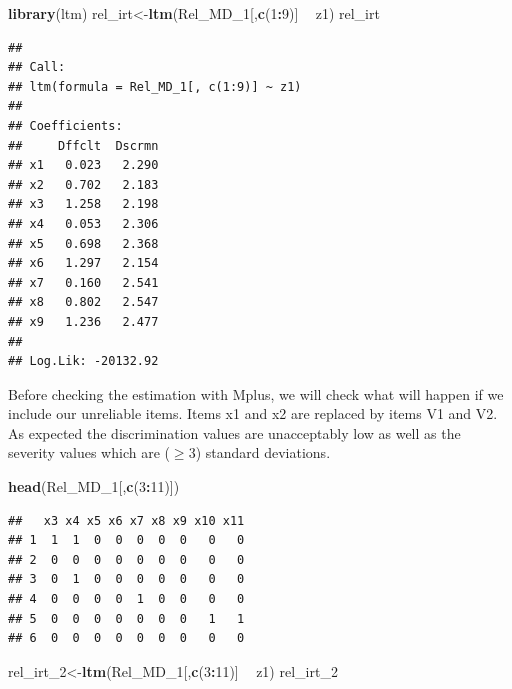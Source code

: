 \documentclass[]{book}
\newenvironment{Shaded}{\begin{snugshade}}{\end{snugshade}}
\newcommand{\DecValTok}[1]{\textcolor[rgb]{0.00,0.00,0.81}{#1}}
\newcommand{\KeywordTok}[1]{\textcolor[rgb]{0.13,0.29,0.53}{\textbf{#1}}}
\newcommand{\NormalTok}[1]{#1}
\newcommand{\OperatorTok}[1]{\textcolor[rgb]{0.81,0.36,0.00}{\textbf{#1}}}
\newcommand{\StringTok}[1]{\textcolor[rgb]{0.31,0.60,0.02}{#1}}
\begin{document}
\begin{Shaded}
\begin{Highlighting}[]
\KeywordTok{library}\NormalTok{(ltm)}
\NormalTok{rel_irt<-}\KeywordTok{ltm}\NormalTok{(Rel_MD_}\DecValTok{1}\NormalTok{[,}\KeywordTok{c}\NormalTok{(}\DecValTok{1}\OperatorTok{:}\DecValTok{9}\NormalTok{)] }\OperatorTok{~}\StringTok{ }\NormalTok{z1)}
\NormalTok{rel_irt}
\end{Highlighting}
\end{Shaded}

\begin{verbatim}
## 
## Call:
## ltm(formula = Rel_MD_1[, c(1:9)] ~ z1)
## 
## Coefficients:
##     Dffclt  Dscrmn
## x1   0.023   2.290
## x2   0.702   2.183
## x3   1.258   2.198
## x4   0.053   2.306
## x5   0.698   2.368
## x6   1.297   2.154
## x7   0.160   2.541
## x8   0.802   2.547
## x9   1.236   2.477
## 
## Log.Lik: -20132.92
\end{verbatim}

Before checking the estimation with Mplus, we will check what will happen if we include our unreliable items. Items x1 and x2 are replaced by items V1 and V2. As expected the discrimination values are unacceptably low as well as the severity values which are (\(\geq3\)) standard deviations.

\begin{Shaded}
\begin{Highlighting}[]
\KeywordTok{head}\NormalTok{(Rel_MD_}\DecValTok{1}\NormalTok{[,}\KeywordTok{c}\NormalTok{(}\DecValTok{3}\OperatorTok{:}\DecValTok{11}\NormalTok{)])}
\end{Highlighting}
\end{Shaded}

\begin{verbatim}
##   x3 x4 x5 x6 x7 x8 x9 x10 x11
## 1  1  1  0  0  0  0  0   0   0
## 2  0  0  0  0  0  0  0   0   0
## 3  0  1  0  0  0  0  0   0   0
## 4  0  0  0  0  1  0  0   0   0
## 5  0  0  0  0  0  0  0   1   1
## 6  0  0  0  0  0  0  0   0   0
\end{verbatim}

\begin{Shaded}
\begin{Highlighting}[]
\NormalTok{rel_irt_}\DecValTok{2}\NormalTok{<-}\KeywordTok{ltm}\NormalTok{(Rel_MD_}\DecValTok{1}\NormalTok{[,}\KeywordTok{c}\NormalTok{(}\DecValTok{3}\OperatorTok{:}\DecValTok{11}\NormalTok{)] }\OperatorTok{~}\StringTok{ }\NormalTok{z1)}
\NormalTok{rel_irt_}\DecValTok{2}
\end{Highlighting}
\end{Shaded}
\end{document}
